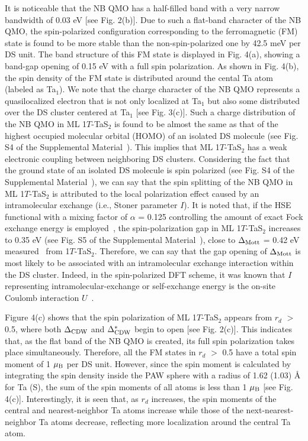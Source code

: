 \documentclass[aps,prl,twocolumn,showpacs,byrevtex]{revtex4}
\begin{document}
It is noticeable that the NB QMO has a half-filled band with a very narrow bandwidth of 0.03 eV [see Fig. 2(b)]. Due to such a flat-band character of the NB QMO, the spin-polarized configuration corresponding to the ferromagnetic (FM) state is found to be more stable than the non-spin-polarized one by 42.5 meV per DS unit. The band structure of this FM state is displayed in Fig. 4(a), showing a band-gap opening of 0.15 eV with a full spin polarization. As shown in Fig. 4(b), the spin density of the FM state is distributed around the cental Ta atom (labeled as Ta$_1$). We note that the charge character of the NB QMO represents a quasilocalized electron that is not only localized at Ta$_1$ but also some distributed over the DS cluster centered at Ta$_1$ [see Fig. 3(c)]. Such a charge distribution of the NB QMO in ML 1$T$-TaS$_2$ is found to be almost the same as that of the highest occupied molecular orbital (HOMO) of an isolated DS molecule (see Fig. S4 of the Supplemental Material~\cite{SM}). This implies that ML 1$T$-TaS$_2$ has a weak electronic coupling between neighboring DS clusters. Considering the fact that the ground state of an isolated DS molecule is spin polarized (see Fig. S4 of the Supplemental Material~\cite{SM}), we can say that the spin splitting of the NB QMO in ML 1$T$-TaS$_2$ is attributed to the local polarization effect caused by an intramolecular exchange (i.e., Stoner parameter $I$). It is noted that, if the HSE functional with a mixing factor of ${\alpha}$ = 0.125 controlling the amount of exact Fock exchange energy is employed~\cite{hse}, the spin-polarization gap in ML 1$T$-TaS$_2$ increases to 0.35 eV (see Fig. S5 of the Supplemental Material~\cite{SM}), close to ${\Delta}_{\rm Mott}$ = 0.42 eV measured~\cite{Yeom} from 1$T$-TaS$_2$. Therefore, we can say that the gap opening of ${\Delta}_{\rm Mott}$ is most likely to be associated with an intramolecular exchange interaction within the DS cluster. Indeed, in the spin-polarized DFT scheme, it was known that $I$ representing intramolecular-exchange or self-exchange energy is the on-site Coulomb interaction $U$~\cite{severin-prl93}.

Figure 4(c) shows that the spin polarization of ML 1$T$-TaS$_2$ appears from $r_d$ $>$ 0.5, where both ${\Delta}_{\rm CDW}$ and ${\Delta}^{*}_{\rm CDW}$ begin to open [see Fig. 2(c)]. This indicates that, as the flat band of the NB QMO is created, its full spin polarization takes place simultaneously. Therefore, all the FM states in $r_d$ $>$ 0.5 have a total spin moment of 1 ${\mu_{\rm B}}$ per DS unit. However, since the spin moment is calculated by integrating the spin density inside the PAW sphere with a radius of 1.62 (1.03) {\AA} for Ta (S), the sum of the spin moments of all atoms is less than 1 ${\mu_{\rm B}}$ [see Fig. 4(c)]. Interestingly, it is seen that, as $r_d$ increases, the spin moments of the central and nearest-neighbor Ta atoms increase while those of the next-nearest-neighbor Ta atoms decrease, reflecting more localization around the central Ta atom.
\end{document}
